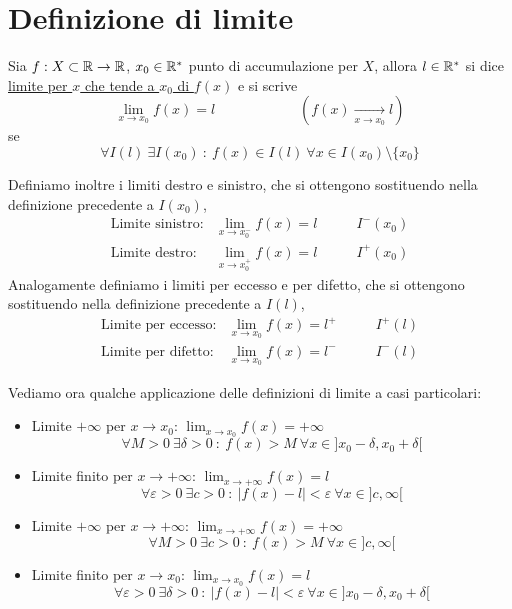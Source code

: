 \section{Definizione di limite}
\begin{boxdef}
    Sia $f:X\subset\mathbb{R}\to \mathbb{R}$, $x_0\in \mathbb{R}^\ast$ punto di accumulazione per $X$, allora $l\in \mathbb{R}^\ast$ si dice \underline{limite per $x$ che tende a $x_0$ di $f(x)$} e si scrive
    \[\lim_{x\to x_0}f(x) = l\qquad\qquad\qquad \left(f(x)\underset{x\to x_0}{\xrightarrow{\hspace{1cm}}}l\right)\]
    se
    \[\forall I(l)\ \exists I(x_0) \ :\ f(x)\in I(l)\ \forall x \in I(x_0)\setminus \{x_0\}\]
\end{boxdef}
Definiamo inoltre i limiti destro e sinistro, che si ottengono sostituendo nella definizione precedente a $I(x_0)$, 
\[\begin{array}{lll}
    \text{Limite sinistro:} & \lim_{x \to x_0^-}f(x) = l \qquad &I^-(x_0)\\
    \text{Limite destro:} & \lim_{x \to x_0^+}f(x) = l & I^ +(x_0)
\end{array}\]
Analogamente definiamo i limiti per eccesso e per difetto, che si ottengono sostituendo nella definizione precedente a $I(l)$, 
\[\begin{array}{lll}
    \text{Limite per eccesso:} & \lim_{x \to x_0}f(x) = l^+\qquad &I^ + (l)\\
    \text{Limite per difetto:} & \lim_{x \to x_0}f(x) = l^-  & I^ - (l)
\end{array}\]

Vediamo ora qualche applicazione delle definizioni di limite a casi particolari:
\begin{itemize}
    \item Limite $+\infty$ per $x\to x_0$: $\lim_{x\to x_0}f(x)=+\infty$
    \[\forall M > 0\ \exists \delta > 0\ :\ f(x) > M\ \forall x \in ] x_0 -\delta, x_0 +\delta[\]
    \item Limite finito per $x\to +\infty$: $\lim_{x\to +\infty}f(x)=l$
    \[\forall \varepsilon > 0\ \exists c > 0\ :\ |f(x) - l |< \varepsilon \ \forall x \in ] c, \infty[\]
    \item Limite $+\infty$ per $x\to +\infty$: $\lim_{x\to +\infty}f(x)=+\infty$
    \[\forall M > 0\ \exists c > 0\ :\ f(x) > M\ \forall x \in ] c,\infty[\]
    \item Limite finito per $x\to x_0$: $\lim_{x\to x_0}f(x)=l$
    \[\forall \varepsilon > 0\ \exists \delta > 0\ :\ |f(x) - l |< \varepsilon \ \forall x \in ] x_0 -\delta, x_0 + \delta[\]
\end{itemize}

